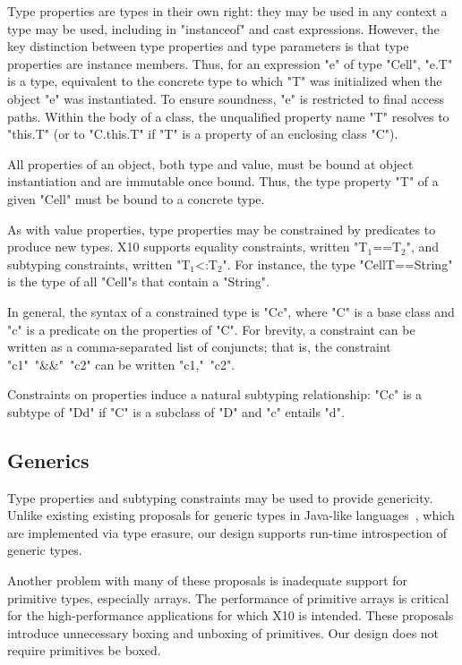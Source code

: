 \documentclass[preprint,nocopyrightspace,9pt]{sigplanconf}
\begin{document}
Type properties are types in their own right:
they may be used in any context a type may be used,
including in \xcd"instanceof" and cast expressions.
However, the key distinction between type properties
and type parameters is that type properties are instance
members.
Thus, for an expression \xcd"e" of type \xcd"Cell", \xcd"e.T" is
a type, equivalent to the concrete type to which \xcd"T" was
initialized when the object \xcd"e" was instantiated.
To ensure
soundness, \xcd"e" is restricted to final access paths.
Within the body of a class, the unqualified property name \xcd"T" resolves
to \xcd"this.T" (or to \xcd"C.this.T" if \xcd"T" is a property of
an enclosing class \xcd"C").

All properties of an object, both type and value, must be bound at object
instantiation and are immutable once bound.  Thus, the type
property \Xcd"T" of a given \Xcd"Cell" must be bound to 
a concrete type.

As with value properties, type properties may be constrained
by predicates to produce new types.
X10 supports
equality constraints, written \xcdmath"T$_1$==T$_2$", and
subtyping constraints, written \xcdmath"T$_1$<:T$_2$".
For instance, the type \xcd"Cell{T==String}" is the type of
all \xcd"Cell"s that contain a \xcd"String".

In general, the syntax of a constrained type is
\xcd"C{c}", where \xcd"C" is a base class and
\xcd"c" is a predicate on the properties of \xcd"C".
For brevity, a constraint can be written as
a comma-separated list of conjuncts; that is, the constraint
\xcd"c1"~\xcd"&&"~\xcd"c2" can be written
\xcd"c1,"~\xcd"c2".

Constraints on properties induce a natural subtyping relationship:
\xcd"C{c}" is a subtype of
\xcd"D{d}" if \xcd"C" is a subclass of \xcd"D" and
\xcd"c" entails \xcd"d".

\subsection{Generics}

Type properties and subtyping constraints may be used to 
provide genericity.  Unlike existing 
existing proposals for generic types in
Java-like
languages~\cite{Java3,adding-wildcards,GJ,Pizza,polyj,thorup97,allen03,allen04,csharp,emir06,scala},
which 
are implemented via type erasure,
our design supports run-time introspection of generic types.

Another problem with many of these proposals is inadequate support
for primitive types, especially arrays. The performance of primitive arrays is
critical for the high-performance applications for which
X10 is intended. These proposals introduce unnecessary boxing
and unboxing of primitives.
Our design does not require primitives be boxed.
\end{document}
